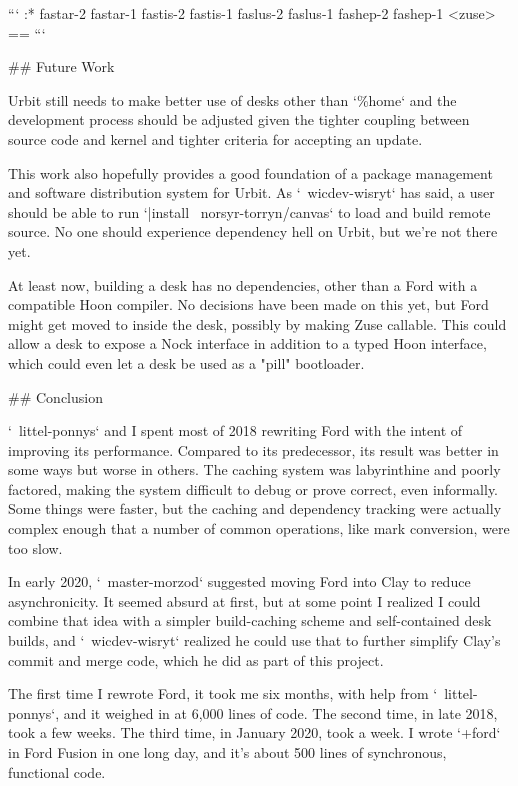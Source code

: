\documentclass[twoside]{article}
\begin{document}
```
:*  fastar-2  fastar-1
    fastis-2  fastis-1
    faslus-2  faslus-1
    fashep-2  fashep-1
    <zuse>
==
```

## Future Work

Urbit still needs to make better use of desks other than `\%home` and the development process should be adjusted given the tighter coupling between source code and kernel and tighter criteria for accepting an update.

This work also hopefully provides a good foundation of a package management and software distribution system for Urbit. As `~wicdev-wisryt` has said, a user should be able to run `|install ~norsyr-torryn/canvas` to load and build remote source. No one should experience dependency hell on Urbit, but we're not there yet.

At least now, building a desk has no dependencies, other than a Ford with a compatible Hoon compiler. No decisions have been made on this yet, but
Ford might get moved to inside the desk, possibly by making Zuse callable. This could allow a desk to expose a Nock interface in addition to a typed Hoon interface, which could even let a desk be used as a "pill" bootloader.

## Conclusion

`~littel-ponnys` and I spent most of 2018 rewriting Ford with the intent of improving its performance. Compared to its predecessor, its result was better in some ways but worse in others. The caching system was labyrinthine and poorly factored, making the system difficult to debug or prove correct, even informally. Some things were faster, but the caching and dependency tracking were actually complex enough that a number of common operations, like mark conversion, were too slow.

In early 2020, `~master-morzod` suggested moving Ford into Clay to reduce asynchronicity. It seemed absurd at first, but at some point I realized I could combine that idea with a simpler build-caching scheme and self-contained desk builds, and `~wicdev-wisryt` realized he could use that to further simplify Clay’s commit and merge code, which he did as part of this project.

The first time I rewrote Ford, it took me six months, with help from `~littel-ponnys`, and it weighed in at 6,000 lines of code. The second time, in late 2018, took a few weeks. The third time, in January 2020, took a week. I wrote `+ford` in Ford Fusion in one long day, and it’s about 500 lines of synchronous, functional code.
\end{document}

